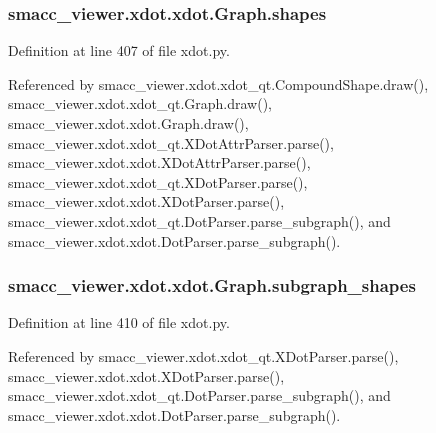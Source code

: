 \subsubsection[{\texorpdfstring{shapes}{shapes}}]{\setlength{\rightskip}{0pt plus 5cm}smacc\+\_\+viewer.\+xdot.\+xdot.\+Graph.\+shapes}\hypertarget{classsmacc__viewer_1_1xdot_1_1xdot_1_1Graph_a6f354c47ee7839b3a7609e42c66165c5}{}\label{classsmacc__viewer_1_1xdot_1_1xdot_1_1Graph_a6f354c47ee7839b3a7609e42c66165c5}


Definition at line 407 of file xdot.\+py.



Referenced by smacc\+\_\+viewer.\+xdot.\+xdot\+\_\+qt.\+Compound\+Shape.\+draw(), smacc\+\_\+viewer.\+xdot.\+xdot\+\_\+qt.\+Graph.\+draw(), smacc\+\_\+viewer.\+xdot.\+xdot.\+Graph.\+draw(), smacc\+\_\+viewer.\+xdot.\+xdot\+\_\+qt.\+X\+Dot\+Attr\+Parser.\+parse(), smacc\+\_\+viewer.\+xdot.\+xdot.\+X\+Dot\+Attr\+Parser.\+parse(), smacc\+\_\+viewer.\+xdot.\+xdot\+\_\+qt.\+X\+Dot\+Parser.\+parse(), smacc\+\_\+viewer.\+xdot.\+xdot.\+X\+Dot\+Parser.\+parse(), smacc\+\_\+viewer.\+xdot.\+xdot\+\_\+qt.\+Dot\+Parser.\+parse\+\_\+subgraph(), and smacc\+\_\+viewer.\+xdot.\+xdot.\+Dot\+Parser.\+parse\+\_\+subgraph().

\subsubsection[{\texorpdfstring{subgraph\+\_\+shapes}{subgraph_shapes}}]{\setlength{\rightskip}{0pt plus 5cm}smacc\+\_\+viewer.\+xdot.\+xdot.\+Graph.\+subgraph\+\_\+shapes}\hypertarget{classsmacc__viewer_1_1xdot_1_1xdot_1_1Graph_adad612ffb824b1f04e480ac8b97f5e2f}{}\label{classsmacc__viewer_1_1xdot_1_1xdot_1_1Graph_adad612ffb824b1f04e480ac8b97f5e2f}


Definition at line 410 of file xdot.\+py.



Referenced by smacc\+\_\+viewer.\+xdot.\+xdot\+\_\+qt.\+X\+Dot\+Parser.\+parse(), smacc\+\_\+viewer.\+xdot.\+xdot.\+X\+Dot\+Parser.\+parse(), smacc\+\_\+viewer.\+xdot.\+xdot\+\_\+qt.\+Dot\+Parser.\+parse\+\_\+subgraph(), and smacc\+\_\+viewer.\+xdot.\+xdot.\+Dot\+Parser.\+parse\+\_\+subgraph().

